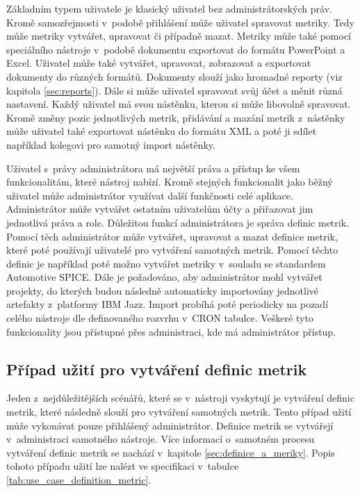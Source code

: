 \documentclass[czech,master]{diploma}
\begin{document}
Základním typem uživatele je klasický uživatel bez administrátorských práv. Kromě samozřejmosti v~podobě přihlášení může uživatel spravovat metriky. Tedy může metriky vytvářet, upravovat či případně mazat. Metriky může také pomocí speciálního nástroje v~podobě dokumentu exportovat do formátu PowerPoint a Excel. Uživatel může také vytvářet, upravovat, zobrazovat a exportovat dokumenty do různých formátů. Dokumenty slouží jako hromadné reporty (viz kapitola \ref{sec:reports}). Dále si může uživatel spravovat svůj účet a měnit různá nastavení. Každý uživatel má svou nástěnku, kterou si může libovolně spravovat. Kromě změny pozic jednotlivých metrik, přidávání a mazání metrik z~nástěnky může uživatel také exportovat nástěnku do formátu XML a poté ji sdílet například kolegovi pro samotný import nástěnky.

Uživatel s~právy administrátora má největší práva a přístup ke všem funkcionalitám, které nástroj nabízí. Kromě stejných funkcionalit jako běžný uživatel může administrátor využívat další funkčnosti celé aplikace. Administrátor může vytvářet ostatním uživatelům účty a přiřazovat jim jednotlivá práva a role. Důležitou funkcí administrátora je správa definic metrik. Pomocí těch administrátor může vytvářet, upravovat a mazat definice metrik, které poté používají uživatelé pro vytváření samotných metrik. Pomocí těchto definic je například poté možno vytvářet metriky v~souladu se standardem Automotive SPICE. Dále je požadováno, aby administrátor mohl vytvářet projekty, do kterých budou následně automaticky importovány jednotlivé artefakty z~platformy IBM Jazz. Import probíhá poté periodicky na pozadí celého nástroje dle definovaného rozvrhu v~CRON tabulce. Veškeré tyto funkcionality jsou přístupné přes 
administraci, kde má administrátor přístup.

\subsection{Případ užití pro vytváření definic metrik}
Jeden z~nejdůležitějších scénářů, které se v~nástroji vyskytují je vytváření definic metrik, které následně slouží pro vytváření samotných metrik. Tento případ užití může vykonávat pouze přihlášený administrátor. Definice metrik se vytvářejí v~administraci samotného nástroje. Více informací o~samotném procesu vytváření definic metrik se nachází v~kapitole \ref{sec:definice_a_meriky}. Popis tohoto případu užití lze nalézt ve specifikaci v~tabulce  \ref{tab:use_case_definition_metric}.
\end{document}
